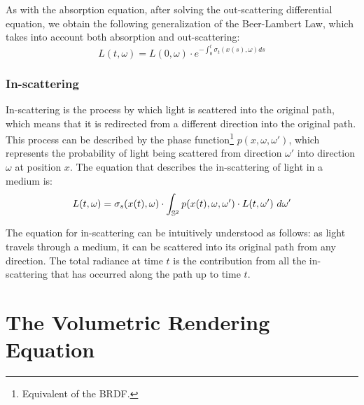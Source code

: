As with the absorption equation, after solving the out-scattering differential equation, we obtain the following generalization of the Beer-Lambert Law, which takes into account both absorption and out-scattering:
\begin{equation}\label{eq:out_scattering}
    L(t,\omega) = L(0,\omega) \cdot e^{\displaystyle -\int_0^t \sigma_t(x(s), \omega) ds}
\end{equation}

\subsubsection{In-scattering}
In-scattering is the process by which light is scattered into the original path, which means that it is redirected from a different direction into the original path. This process can be described by the phase function\footnote{Equivalent of the BRDF.} $p(x, \omega, \omega')$, which represents the probability of light being scattered from direction $\omega'$ into direction $\omega$ at position $x$. The equation that describes the in-scattering of light in a medium is:
\begin{equation}
    L(t,\omega) = \sigma_s(x(t), \omega) \cdot \int_{\bb{S}^2} p(x(t), \omega, \omega') \cdot L(t,\omega') \ d\omega'
\end{equation}
\begin{observacion}
    The equation for in-scattering can be intuitively understood as follows: as light travels through a medium, it can be scattered into its original path from any direction. The total radiance at time $t$ is the contribution from all the in-scattering that has occurred along the path up to time $t$.
\end{observacion}

\section{The Volumetric Rendering Equation}

